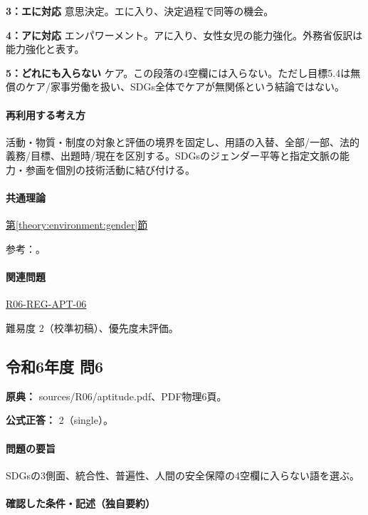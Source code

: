 \noindent\textbf{3：エに対応} 意思決定。エに入り、決定過程で同等の機会。\par

\noindent\textbf{4：アに対応} エンパワーメント。アに入り、女性女児の能力強化。外務省仮訳は能力強化と表す。\par

\noindent\textbf{5：どれにも入らない} ケア。この段落の4空欄には入らない。ただし目標5.4は無償のケア/家事労働を扱い、SDGs全体でケアが無関係という結論ではない。\par

\paragraph{再利用する考え方} 活動・物質・制度の対象と評価の境界を固定し、用語の入替、全部/一部、法的義務/目標、出題時/現在を区別する。SDGsのジェンダー平等と指定文脈の能力・参画を個別の技術活動に結び付ける。

\paragraph{共通理論} \hyperref[theory:environment:gender]{第\ref*{theory:environment:gender}節}

\par 参考：\cite{env_sdgs_agenda}。

\paragraph{関連問題} \hyperref[q:r06-reg-apt-06]{R06-REG-APT-06}

\par 難易度 2（校準初稿）、優先度未評価。

\subsection{令和6年度 問6}
\label{q:r06-reg-apt-06}

\noindent\textbf{原典：} sources/R06/aptitude.pdf、PDF物理6頁。

\textbf{公式正答：} 2（single）。

\paragraph{問題の要旨} SDGsの3側面、統合性、普遍性、人間の安全保障の4空欄に入らない語を選ぶ。

\paragraph{確認した条件・記述（独自要約）}\mbox{}\par

